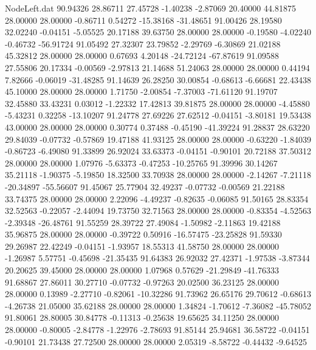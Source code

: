 \begin{filecontents}{NodeLeft.dat}
  90.94326   28.86711   27.45728    -1.40238   -2.87069   20.40000   44.81875   28.00000   28.00000   -0.86711    0.54272  -15.38168  -31.48651
  91.00426   28.19580   32.02240    -0.04151   -5.05525   20.17188   39.63750   28.00000   28.00000   -0.19580   -4.02240   -0.46732  -56.91724
  91.05492   27.32307   23.79852    -2.29769   -6.30869   21.02188   45.32812   28.00000   28.00000    0.67693    4.20148  -24.72124  -67.87619
  91.09588   27.55806   20.17334    -0.00569   -2.97813   21.14688   51.24063   28.00000   28.00000    0.44194    7.82666   -0.06019  -31.48285
  91.14639   26.28250   30.00854    -0.68613   -6.66681   22.43438   45.10000   28.00000   28.00000    1.71750   -2.00854   -7.37003  -71.61120
  91.19707   32.45880   33.43231     0.03012   -1.22332   17.42813   39.81875   28.00000   28.00000   -4.45880   -5.43231    0.32258  -13.10207
  91.24778   27.69226   27.62512    -0.04151   -3.80181   19.53438   43.00000   28.00000   28.00000    0.30774    0.37488   -0.45190  -41.39224
  91.28837   28.63220   29.84039    -0.07732   -0.57869   19.47188   41.93125   28.00000   28.00000   -0.63220   -1.84039   -0.86723   -6.49080
  91.33899   26.92024   33.63373    -0.04151   -0.90101   20.72188   37.50312   28.00000   28.00000    1.07976   -5.63373   -0.47253  -10.25765
  91.39996   30.14267   35.21118    -1.90375   -5.19850   18.32500   33.70938   28.00000   28.00000   -2.14267   -7.21118  -20.34897  -55.56607
  91.45067   25.77904   32.49237    -0.07732   -0.00569   21.22188   33.74375   28.00000   28.00000    2.22096   -4.49237   -0.82635   -0.06085
  91.50165   28.83354   32.52563    -0.22057   -2.44094   19.73750   32.71563   28.00000   28.00000   -0.83354   -4.52563   -2.39348  -26.48761
  91.55259   28.39722   27.49084    -1.50982   -2.11863   19.42188   35.96875   28.00000   28.00000   -0.39722    0.50916  -16.57475  -23.25828
  91.59330   29.26987   22.42249    -0.04151   -1.93957   18.55313   41.58750   28.00000   28.00000   -1.26987    5.57751   -0.45698  -21.35435
  91.64383   26.92032   27.42371    -1.97538   -3.87344   20.20625   39.45000   28.00000   28.00000    1.07968    0.57629  -21.29849  -41.76333
  91.68867   27.86011   30.27710    -0.07732   -0.97263   20.02500   36.23125   28.00000   28.00000    0.13989   -2.27710   -0.82061  -10.32286
  91.73962   26.65176   29.70612    -0.68613   -4.26738   21.05000   35.62188   28.00000   28.00000    1.34824   -1.70612   -7.36082  -45.78052
  91.80061   28.80005   30.84778    -0.11313   -0.25638   19.65625   34.11250   28.00000   28.00000   -0.80005   -2.84778   -1.22976   -2.78693
  91.85144   25.94681   36.58722    -0.04151   -0.90101   21.73438   27.72500   28.00000   28.00000    2.05319   -8.58722   -0.44432   -9.64525

\end{filecontents}
